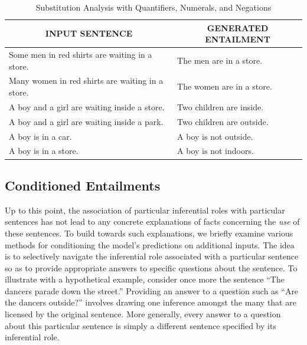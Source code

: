 \documentclass[utf8]{frontiersSCNS} %
\begin{document}
\begin{table}[!t]
\begin{center} 
\caption{Substitution Analysis with Quantifiers, Numerals, and Negations} 
\label{tab:quantifiers} 
\vskip 0.06in

\setlength{\tabcolsep}{13pt}
\begin{tabular}{ll} 
\hline

\multicolumn{1}{c}{\rule{0pt}{3ex} INPUT SENTENCE} & 
\multicolumn{1}{c}{GENERATED ENTAILMENT} \\

\hline
\rule{0pt}{3ex} Some men in red shirts are waiting in a store. & \quad The men are in a store. \\
Many women in red shirts are waiting in a store. & \quad The women are in a store. \\
A boy and a girl are waiting inside a store. & \quad Two children are inside. \\
A boy and a girl are waiting inside a park. & \quad Two children are outside. \\
A boy is in a car. & \quad A boy is not outside. \\
A boy is in a store. & \quad A boy is not indoors. \\
\hline
\end{tabular}

\end{center} 
\end{table}

\subsection{Conditioned Entailments}\label{sec:conditioned}

Up to this point, the association of particular inferential roles with particular sentences has not lead to any concrete explanations of facts concerning the \textit{use} of these sentences. To build towards such explanations, we briefly examine various methods for conditioning the model's predictions on additional inputs. The idea is to selectively navigate the inferential role associated with a particular sentence so as to provide appropriate answers to specific questions about the sentence. To illustrate with a hypothetical example, consider once more the sentence ``The dancers parade down the street.'' Providing an answer to a question such as ``Are the dancers outside?'' involves drawing one inference amongst the many that are licensed by the original sentence. More generally, every answer to a question about this particular sentence is simply a different sentence specified by its inferential role.
\end{document}
